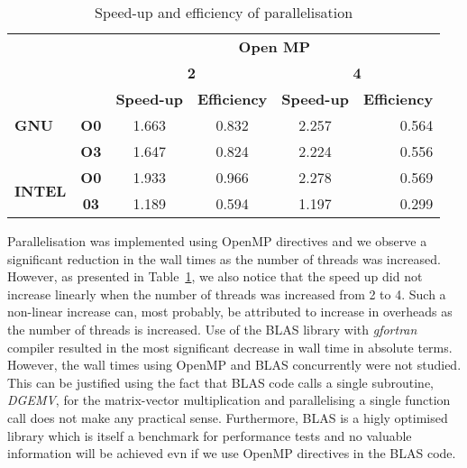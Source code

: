 \documentclass[11pt, oneside]{article}   	%
\begin{document}
\begin{table}[htp]
\caption{Speed-up and efficiency of parallelisation}
\label{tab:su}
\centering
\begin{tabular}{@{}lccccr@{}}
\toprule
                                & \multicolumn{1}{l}{} & \multicolumn{4}{c}{\textbf{Open MP}}                                                                  \\ \cmidrule(l){3-6} 
                                & \multicolumn{1}{l}{} & \multicolumn{2}{c}{\textbf{2}}          & \multicolumn{2}{c}{\textbf{4}}                              \\ \cmidrule(l){3-6} 
                                & \multicolumn{1}{l}{} & \textbf{Speed-up} & \textbf{Efficiency} & \textbf{Speed-up} & \multicolumn{1}{c}{\textbf{Efficiency}} \\ \midrule
\textbf{GNU}                    & \textbf{O0}          & 1.663             & 0.832               & 2.257             & 0.564                                   \\
                                & \textbf{O3}          & 1.647             & 0.824               & 2.224             & 0.556                                   \\
\multirow{2}{*}{\textbf{INTEL}} & \textbf{O0}          & 1.933             & 0.966               & 2.278             & 0.569                                   \\
                                & \textbf{03}          & 1.189             & 0.594               & 1.197             & 0.299                                   \\ \bottomrule
\end{tabular}
\end{table}

Parallelisation was implemented using OpenMP directives and we observe a significant reduction in the wall times as the number of threads was increased. However, as presented in Table~\ref{tab:su}, we also notice that the speed up did not increase linearly when the number of threads was increased from 2 to 4. Such a non-linear increase can, most probably, be attributed to increase in overheads as the number of threads is increased. Use of the BLAS library with \textit{gfortran} compiler resulted in the most significant decrease in wall time in absolute terms. However, the wall times using OpenMP and BLAS concurrently were not studied. This can be justified using the fact that BLAS code calls a single subroutine, \textit{DGEMV}, for the matrix-vector multiplication and parallelising a single function call does not make any practical sense. Furthermore, BLAS is a higly optimised library which is itself a benchmark for performance tests and no valuable information will be achieved evn if we use OpenMP directives in the BLAS code.
\end{document}
